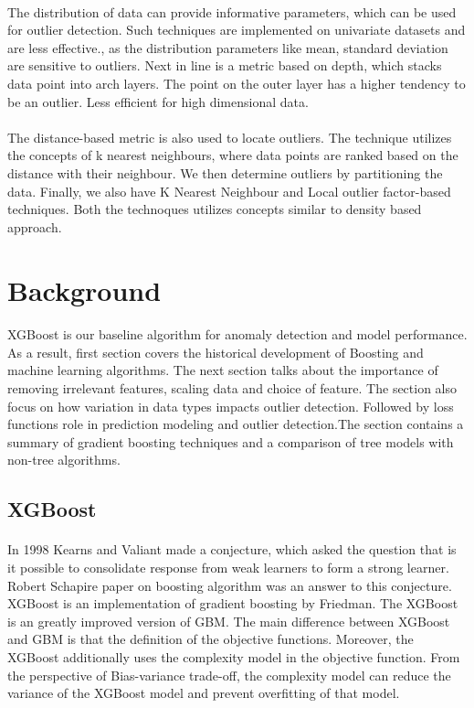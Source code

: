 \documentclass[runningheads]{llncs}
\begin{document}
\paragraph{} The distribution of data can provide informative parameters,  which can be used for outlier detection. Such techniques are implemented on univariate datasets and are less effective., as the distribution parameters like mean, standard deviation are sensitive to outliers. 
Next in line is a metric based on depth, which stacks data point into arch layers. The point on the outer layer has a higher tendency to be an outlier. Less efficient for high dimensional data.

\paragraph{} The distance-based metric is also used to locate outliers. The technique utilizes the concepts of k nearest neighbours, where data points are ranked based on the distance with their neighbour. We then determine outliers by partitioning the data.  Finally, we also have K Nearest Neighbour and Local outlier factor-based techniques. Both the technoques utilizes concepts similar to density based approach.

\section{Background}
\paragraph{} XGBoost is our baseline algorithm for anomaly detection and model performance. As a result, first section covers the historical development of Boosting and machine learning algorithms. The next section talks about the importance of removing irrelevant features, scaling data and choice of feature. The section also focus on how variation in data types impacts outlier detection. Followed by loss functions role in prediction modeling and outlier detection.The section contains a summary of gradient boosting techniques and a comparison of tree models with non-tree algorithms.


\subsection{XGBoost}
\paragraph{ }In 1998 Kearns and Valiant made a conjecture, which asked the question that is it possible to consolidate response from weak learners to form a strong learner. Robert Schapire paper on boosting algorithm was an answer to this conjecture. XGBoost is an implementation of gradient boosting by Friedman. The XGBoost is an greatly improved version of GBM. The main difference between XGBoost and GBM is that the definition of the objective functions. Moreover, the XGBoost additionally uses the complexity model in the objective function. From the perspective of Bias-variance trade-off, the complexity model can reduce the variance of the XGBoost model and prevent overfitting of that model.
\end{document}
